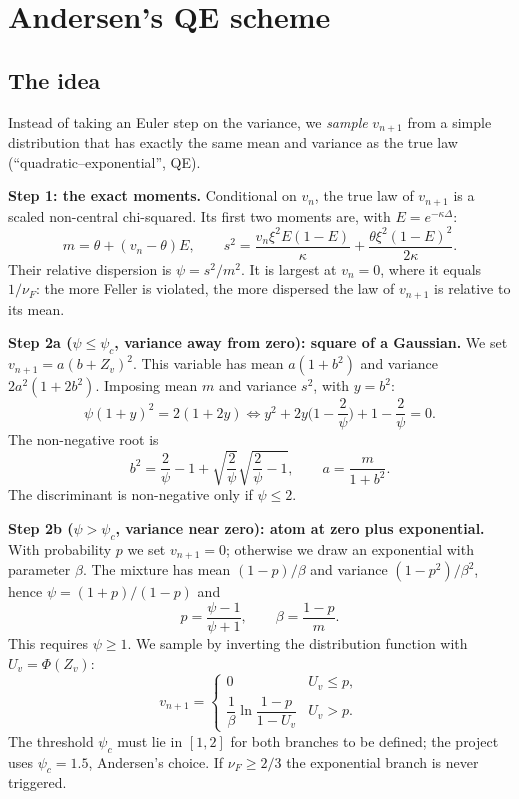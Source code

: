 \section{Andersen's QE scheme}
\subsection{The idea}
Instead of taking an Euler step on the variance, we \emph{sample} $v_{n+1}$ from a simple distribution that has
exactly the same mean and variance as the true law (``quadratic--exponential'', QE).

\textbf{Step 1: the exact moments.} Conditional on $v_n$, the true law of $v_{n+1}$ is a scaled non-central
chi-squared. Its first two moments are, with $E=e^{-\kappa\Delta}$:
\begin{equation}\label{eq:qe-momenti}
m=\theta+(v_n-\theta)E,\qquad
s^2=\frac{v_n\xi^2E(1-E)}{\kappa}+\frac{\theta\xi^2(1-E)^2}{2\kappa}.
\end{equation}
Their relative dispersion is $\psi=s^2/m^2$. It is largest at $v_n=0$, where it equals $1/\nu_F$: the more Feller is
violated, the more dispersed the law of $v_{n+1}$ is relative to its mean.

\textbf{Step 2a ($\psi\le\psi_c$, variance away from zero): square of a Gaussian.} We set $v_{n+1}=a(b+Z_v)^2$. This
variable has mean $a(1+b^2)$ and variance $2a^2(1+2b^2)$. Imposing mean $m$ and variance $s^2$, with $y=b^2$:
\[
\psi(1+y)^2=2(1+2y)\iff y^2+2y\Big(1-\frac2\psi\Big)+1-\frac2\psi=0 .
\]
The non-negative root is
\begin{equation}\label{eq:qe-quad}
b^2=\frac2\psi-1+\sqrt{\frac2\psi}\sqrt{\frac2\psi-1},\qquad a=\frac{m}{1+b^2}.
\end{equation}
The discriminant is non-negative only if $\psi\le2$.

\textbf{Step 2b ($\psi>\psi_c$, variance near zero): atom at zero plus exponential.} With probability $p$ we set
$v_{n+1}=0$; otherwise we draw an exponential with parameter $\beta$. The mixture has mean $(1-p)/\beta$ and variance
$(1-p^2)/\beta^2$, hence $\psi=(1+p)/(1-p)$ and
\begin{equation}\label{eq:qe-exp}
p=\frac{\psi-1}{\psi+1},\qquad\beta=\frac{1-p}{m}.
\end{equation}
This requires $\psi\ge1$. We sample by inverting the distribution function with $U_v=\Phi(Z_v)$:
\[
v_{n+1}=\begin{cases}0 & U_v\le p,\\[2pt] \dfrac1\beta\ln\dfrac{1-p}{1-U_v} & U_v>p.\end{cases}
\]
The threshold $\psi_c$ must lie in $[1,2]$ for both branches to be defined; the project uses $\psi_c=1.5$, Andersen's
choice. If $\nu_F\ge2/3$ the exponential branch is never triggered.

